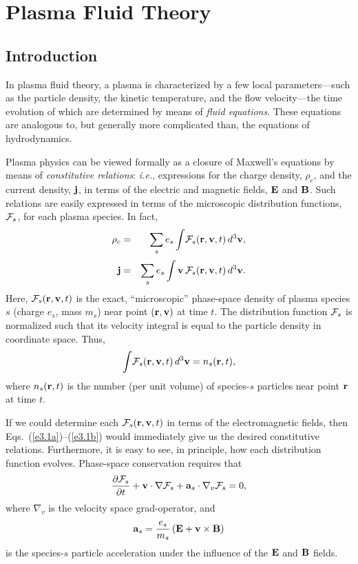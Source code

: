 \chapter {Plasma Fluid Theory}\label{s3}
\section{Introduction}\label{s3.1}
In plasma fluid theory, a plasma is characterized by a few local parameters---such as the particle density, the kinetic temperature, and the flow
velocity---the time evolution of which are determined by means of {\em fluid
equations}. These equations are analogous to, but generally more complicated
than, the equations of hydrodynamics.

Plasma physics can be viewed formally as a closure of Maxwell's equations
by means of {\em constitutive relations}: {\em i.e.}, expressions
for the charge density, $\rho_c$, and the current density, ${\bf j}$, in terms of
the electric and magnetic fields, ${\bf E}$ and ${\bf B}$. Such relations are
easily expressed in terms of the microscopic distribution functions,
${\cal F}_s$, for each plasma species. In fact,
\begin{eqnarray}\label{e3.1a}
\rho_c &=& \sum_s e_s \int\! {\cal F}_s({\bf r}, {\bf v}, t)\,d^3{\bf v},\\[0.5ex]
{\bf j} &=& \sum_s e_s \int {\bf v}\,{\cal F}_s({\bf r}, {\bf v}, t)\,d^3
{\bf v}.\label{e3.1b}
\end{eqnarray}
Here, ${\cal F}_s({\bf r}, {\bf v}, t)$ is the exact, ``microscopic'' phase-space
density of plasma species $s$ (charge $e_s$, mass $m_s$) near
point $({\bf r}, {\bf v})$  at time $t$. The distribution
function ${\cal F}_s$ is normalized such that its velocity integral is equal to the
particle density in coordinate space. Thus,
\begin{equation}
\int \!{\cal F}_s({\bf r}, {\bf v}, t)\,d^3
{\bf v} = n_s({\bf r}, t),
\end{equation}
where $n_s({\bf r},t)$ is the number (per unit volume) of species-$s$ particles
near point ${\bf r}$ at time $t$. 

If we could determine each ${\cal F}_s({\bf r},{\bf v}, t)$ in terms of the
electromagnetic fields, then Eqs.~(\ref{e3.1a})--(\ref{e3.1b}) would immediately give us the
desired constitutive relations. Furthermore, it is easy to see, in principle,
how each distribution function evolves. Phase-space conservation
requires that
\begin{equation}\label{e3.3}
\frac{\partial{\cal F}_s}{\partial t} + {\bf v}\cdot\nabla{\cal F}_s
+ {\bf a}_s\cdot\nabla_v{\cal F}_s = 0,
\end{equation}
where $\nabla_v$ is the velocity space grad-operator, and
\begin{equation}
{\bf a}_s = \frac{e_s}{m_s}\,({\bf E} + {\bf v}\times{\bf B})
\end{equation}
is the species-$s$ particle acceleration under the influence of the ${\bf E}$ and
${\bf B}$ fields. 

